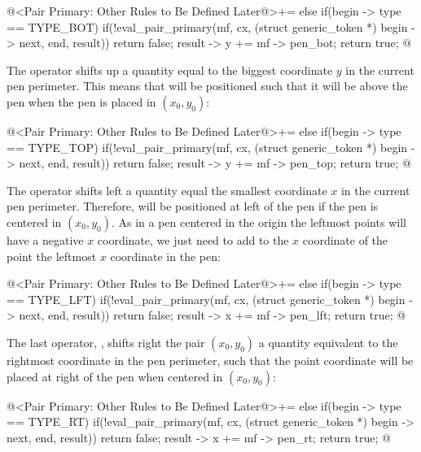 {{{{{\iniciocodigo
@<Pair Primary: Other Rules to Be Defined Later@>+=
else if(begin -> type == TYPE_BOT){
  if(!eval_pair_primary(mf, cx, (struct generic_token *)
                                begin -> next,
                        end, result))
    return false;
  result -> y += mf -> pen_bot;
  return true;
}
@
\fimcodigo

The operator  shifts up a quantity equal to the
biggest coordinate $y$ in the current pen perimeter. This means that
 will be positioned such that it will be above
the pen when the pen is placed in $(x_0, y_0)$:

\iniciocodigo
@<Pair Primary: Other Rules to Be Defined Later@>+=
else if(begin -> type == TYPE_TOP){
  if(!eval_pair_primary(mf, cx, (struct generic_token *)
                                begin -> next,
                        end, result))
    return false;
  result -> y += mf -> pen_top;
  return true;
}
@
\fimcodigo

The operator  shifts left a quantity equal the
smallest coordinate $x$ in the current pen
perimeter. Therefore,  will be positioned at
left of the pen if the pen is centered in $(x_0, y_0)$. As in a pen
centered in the origin the leftmost points will have a negative $x$
coordinate, we just need to add to the $x$ coordinate of the point the
leftmost $x$ coordinate in the pen:

\iniciocodigo
@<Pair Primary: Other Rules to Be Defined Later@>+=
else if(begin -> type == TYPE_LFT){
  if(!eval_pair_primary(mf, cx, (struct generic_token *)
                                begin -> next,
                        end, result))
    return false;
  result -> x += mf -> pen_lft;
  return true;
}
@
\fimcodigo

The last operator, , shifts right the pair $(x_0, y_0)$
a quantity equivalent to the rightmost coordinate in the pen
perimeter, such that the point coordinate will be placed at
right of the pen when centered in $(x_0, y_0)$:

\iniciocodigo
@<Pair Primary: Other Rules to Be Defined Later@>+=
else if(begin -> type == TYPE_RT){
  if(!eval_pair_primary(mf, cx, (struct generic_token *)
                                begin -> next,
                        end, result))
    return false;
  result -> x += mf -> pen_rt;
  return true;
}
@
\fimcodigo



}}}}}
